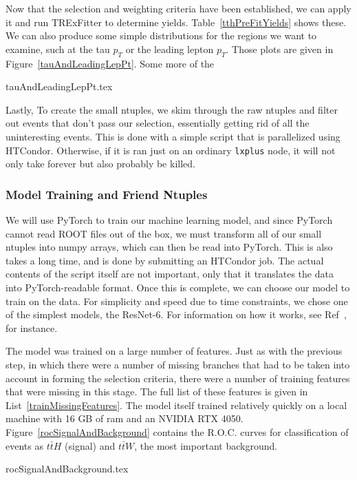     Now that the selection and weighting criteria have been established, we can apply it and run TRExFitter to determine yields. Table~\ref{tthPreFitYields} shows these. We can also produce some simple distributions for the regions we want to examine, such at the tau $p_T$ or the leading lepton $p_T$. Those plots are given in Figure~\ref{tauAndLeadingLepPt}. Some more of the 

    {tauAndLeadingLepPt.tex}

    

    Lastly, To create the small ntuples, we skim through the raw ntuples and filter out events that don't pass our selection, essentially getting rid of all the uninteresting events. This is done with a simple script that is parallelized using HTCondor. Otherwise, if it is ran just on an ordinary \texttt{lxplus} node, it will not only take forever but also probably be killed.


\subsubsection{Model Training and Friend Ntuples}
    We will use PyTorch to train our machine learning model, and since PyTorch cannot read ROOT files out of the box, we must transform all of our small ntuples into numpy arrays, which can then be read into PyTorch. This is also takes a long time, and is done by submitting an HTCondor job. The actual contents of the script itself are not important, only that it translates the data into PyTorch-readable format. Once this is complete, we can choose our model to train on the data. For simplicity and speed due to time constraints, we chose one of the simplest models, the ResNet-6. For information on how it works, see Ref~\cite{resnet}, for instance.

    The model was trained on a large number of features. Just as with the previous step, in which there were a number of missing branches that had to be taken into account in forming the selection criteria, there were a number of training features that were missing in this stage. The full list of these features is given in List~\ref{trainMissingFeatures}. The model itself trained relatively quickly on a local machine with 16 GB of ram and an NVIDIA RTX 4050. Figure~\ref{rocSignalAndBackground} contains the R.O.C. curves for classification of events as $t\bar{t}H$ (signal) and $t\bar{t}W$, the most important background.

    {rocSignalAndBackground.tex}

